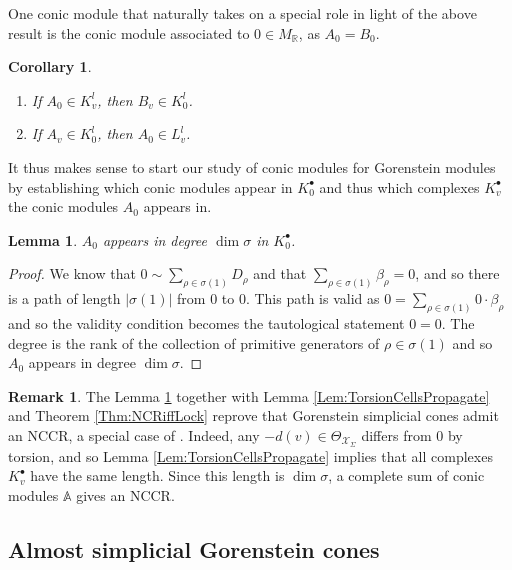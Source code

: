 \documentclass[reqno, 12pt]{amsart}
\newtheorem{lemma}[theorem]{Lemma}
\newtheorem{corollary}[theorem]{Corollary}
\theoremstyle{definition}
\newtheorem{remark}[theorem]{Remark}
\numberwithin{equation}{section}
\newcommand{\R}{\mathbb{R}}
\begin{document}
One conic module that naturally takes on a special role in light of the above result is the conic module associated to $0\in M_\R$, as $A_0=B_0$.
\begin{corollary}
    \label{Cor:A0PseudoSym}
    \begin{enumerate}
        \item If $A_0\in K_v^l$, then $B_v\in K_0^l$.
        \item If $A_v\in K_0^l$, then $A_0\in L_v^l$.
    \end{enumerate}
\end{corollary}

It thus makes sense to start our study of conic modules for Gorenstein modules by establishing which conic modules appear in $K_0^\bullet$ and thus which complexes $K_v^\bullet$ the conic modules $A_0$ appears in. 


\begin{lemma}
    \label{Lem:Gor0isself}
    $A_0$ appears in degree $\dim \sigma$ in $K_0^\bullet$. 
\end{lemma}
\begin{proof}
    We know that $0\sim \sum_{\rho\in \sigma(1)}D_\rho$ and that $\sum_{\rho\in \sigma(1)}\beta_\rho=0$, and so there is a path of length $|\sigma(1)|$ from 0 to 0. This path is valid as $0=\sum_{\rho\in \sigma(1)}0\cdot \beta_\rho$ and so the validity condition becomes the tautological statement $0=0$. The degree is the rank of the collection of primitive generators of $\rho\in \sigma(1)$ and so $A_0$ appears in degree $\dim\sigma$.
\end{proof}

\begin{remark}
The Lemma \ref{Lem:Gor0isself} together with Lemma \ref{Lem:TorsionCellsPropagate} and Theorem \ref{Thm:NCRiffLock}  reprove that Gorenstein simplicial cones admit an NCCR, a special case of \cite[Proposition 7.5]{FMS19}. Indeed, any $-d(v)\in \Theta_{\mathcal{X}_\Sigma}$ differs from $0$ by torsion, and so Lemma \ref{Lem:TorsionCellsPropagate} implies that all complexes $K_v^\bullet$ have the same length. Since this length is $\dim \sigma$, a complete sum of conic modules $\mathbb{A}$ gives an NCCR.
\end{remark}



\subsection{Almost simplicial Gorenstein cones}
\end{document}
